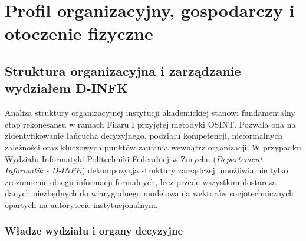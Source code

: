 \chapter{Profil organizacyjny, gospodarczy i otoczenie fizyczne}\label{ch:organizacja}


\section{Struktura organizacyjna i zarządzanie wydziałem D-INFK}\label{sec:struktura-dinfk}

Analiza struktury organizacyjnej instytucji akademickiej stanowi fundamentalny etap rekonesansu w ramach Filaru I przyjętej metodyki OSINT. Pozwala ona na zidentyfikowanie łańcucha decyzyjnego, podziału kompetencji, nieformalnych zależności oraz kluczowych punktów zaufania wewnątrz organizacji. W przypadku Wydziału Informatyki Politechniki Federalnej w Zurychu (\textit{Departement Informatik - D-INFK}) dekompozycja struktury zarządczej umożliwia nie tylko zrozumienie obiegu informacji formalnych, lecz przede wszystkim dostarcza danych niezbędnych do wiarygodnego modelowania wektorów socjotechnicznych opartych na autorytecie instytucjonalnym.

\subsection{Władze wydziału i organy decyzyjne}\label{subsec:wladze-wydzialu}

